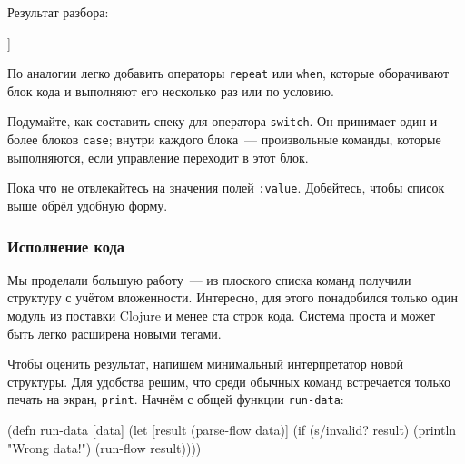 Результат разбора:

\begin{english}
  \begin{clojure}
[[:for
  {:this {:command "for"}
   :flow
   [[:if
     {:this {:command "if" :condition "..."}
      :flow [[:cmd {:command "print" :text "hello"}]]
      :end {:command "end"}}]]
   :end {:command "end"}}]]
  \end{clojure}
\end{english}

По аналогии легко добавить операторы \texttt{repeat} или \verb|when|, которые
оборачивают блок кода и выполняют его несколько раз или по условию.

Подумайте, как составить спеку для оператора \texttt{switch}. Он принимает один
и более блоков \verb|case|; внутри каждого блока~--- произвольные команды,
которые выполняются, если управление переходит в этот блок.

\begin{english}
  \begin{clojure}
  \end{clojure}
\end{english}

Пока что не отвлекайтесь на значения полей \verb|:value|. Добейтесь, чтобы
список выше обрёл удобную форму.

\subsubsection{Исполнение кода}


Мы проделали большую работу~--- из плоского списка команд получили структуру с
учётом вложенности. Интересно, для этого понадобился только один модуль из
поставки Clojure и менее ста строк кода. Система проста и может быть легко
расширена новыми тегами.

Чтобы оценить результат, напишем минимальный интерпретатор новой структуры. Для
удобства решим, что среди обычных команд встречается только печать на экран,
\texttt{print}. Начнём с общей функции \texttt{run-data}:

\begin{english}
  \begin{clojure}
(defn run-data [data]
  (let [result (parse-flow data)]
    (if (s/invalid? result)
      (println "Wrong data!")
      (run-flow result))))
  \end{clojure}
\end{english}

